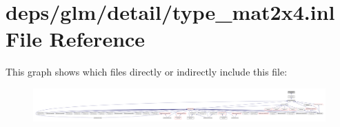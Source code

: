 \hypertarget{type__mat2x4_8inl}{}\section{deps/glm/detail/type\+\_\+mat2x4.inl File Reference}
\label{type__mat2x4_8inl}
This graph shows which files directly or indirectly include this file\+:
\nopagebreak
\begin{figure}[H]
\begin{center}
\leavevmode
\includegraphics[width=350pt]{de/d51/type__mat2x4_8inl__dep__incl}
\end{center}
\end{figure}
